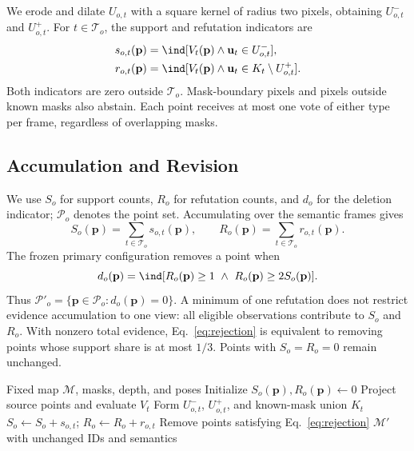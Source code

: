 We erode and dilate $U_{o,t}$ with a square kernel of radius two pixels, obtaining $U^-_{o,t}$ and $U^+_{o,t}$. For $t\in\mathcal T_o$, the support and refutation indicators are
\begin{align}
s_{o,t}(\mathbf p)&=\ind[V_t(\mathbf p)\land\mathbf u_t\in U^-_{o,t}],\\
r_{o,t}(\mathbf p)&=\ind[V_t(\mathbf p)\land\mathbf u_t\in K_t\setminus U^+_{o,t}].
\label{eq:votes}
\end{align}
Both indicators are zero outside $\mathcal T_o$. Mask-boundary pixels and pixels outside known masks also abstain. Each point receives at most one vote of either type per frame, regardless of overlapping masks.

\subsection{Accumulation and Revision}
We use $S_o$ for support counts, $R_o$ for refutation counts, and $d_o$ for the deletion indicator; $\mathcal P_o$ denotes the point set. Accumulating over the semantic frames gives
\begin{equation}
S_o(\mathbf p)=\sum_{t\in\mathcal T_o}s_{o,t}(\mathbf p),\qquad
R_o(\mathbf p)=\sum_{t\in\mathcal T_o}r_{o,t}(\mathbf p).
\end{equation}
The frozen primary configuration removes a point when
\begin{equation}
d_o(\mathbf p)=\ind[R_o(\mathbf p)\geq1\ \land\ R_o(\mathbf p)\geq2S_o(\mathbf p)].
\label{eq:rejection}
\end{equation}
Thus $\mathcal P'_o=\{\mathbf p\in\mathcal P_o:d_o(\mathbf p)=0\}$. A minimum of one refutation does not restrict evidence accumulation to one view: all eligible observations contribute to $S_o$ and $R_o$. With nonzero total evidence, Eq.~\eqref{eq:rejection} is equivalent to removing points whose support share is at most $1/3$. Points with $S_o=R_o=0$ remain unchanged.

\begin{algorithm}[t]
\caption{Fixed-identity source-point revision}
\label{alg:revision}
\begin{algorithmic}[1]
\Require Fixed map $\mathcal M$, masks, depth, and poses
\State Initialize $S_o(\mathbf p),R_o(\mathbf p)\gets0$
  \State Project source points and evaluate $V_t$
    \State Form $U^-_{o,t}$, $U^+_{o,t}$, and known-mask union $K_t$
    \State $S_o\gets S_o+s_{o,t}$; $R_o\gets R_o+r_{o,t}$
  \EndFor
\EndFor
\State Remove points satisfying Eq.~\eqref{eq:rejection}
\State \Return $\mathcal M'$ with unchanged IDs and semantics
\end{algorithmic}
\end{algorithm}

